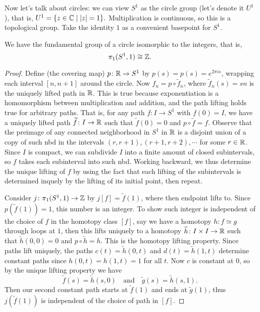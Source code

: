 Now let's talk about circles: we can view $S^{1} $ as the circle group (let's denote it $U^1$), that is, $U^1 = \{z\in \mathbb{C}\mid |z|=1\}.$ Multiplication is continuous, so this is a topological group. Take the identity $1$ as a convenient basepoint for  $S^{1} $.
\begin{theorem}
    We have the fundamental group of a circle isomorphic to the integers, that is, \[
        \pi_1(S^{1} ,1)\cong\mathbb{Z}.
    \] 
\end{theorem}
\begin{proof}
    Define (the covering map) $p \colon \mathbb{R} \to S^1 $ by $p(s)=p(s)=e^{2\pi is}$, wrapping each interval $[n,n+1]$ around the circle. Now $f_n =p\circ \widetilde f_n $, where $\widetilde f_n(s)=sn $ is the uniquely lifted path in $\mathbb{R}$. This is true because exponentiation is a homomorphism between multiplication and addition, and the path lifting holds true for arbitrary paths. That is, for any path $f \colon I \to S^1 $ with $f(0)=I$, we have a uniquely lifted path $\widetilde f\colon I \to \mathbb{R}$ such that $\widetilde f(0)=0$ and $p\circ \widetilde f=f$. Observe that the preimage of any connected neighborhood in $S^1 $ in $\mathbb{R}$ is a disjoint union of a copy of such nbd in the intervals $(r,r+1),(r+1,r+2),\cdots $ for some $r\in \mathbb{R}$. Since $I$ is compact, we can subdivide $I$ into a finite amount of closed subintervals, so $f$ takes each subinterval into such nbd. Working backward, we thus determine the unique lifting of $f$ by using the fact that each lifting of the subintervals is determined inquely by the lifting of its initial point, then repeat.

    Consider $j \colon \pi_1(S^1 ,1) \to \mathbb{Z}$ by $j[f]=\widetilde f(1)$, where then endpoint lifts to. Since $p( \widetilde f(1))=1$, this number is an integer. To show such integer is independent of the choice of $f$ in the homotopy class $[f]$, say we have a homotopy $h \colon f \simeq g$ through loops at $1$, then this lifts uniquely to a homotopy $\widetilde h \colon I\times I \to \mathbb{R}$ such that $\widetilde h(0,0)=0$ and $p\circ \widetilde h=h$. This is the homotopy lifting property. Since paths lift uniquely, the paths $c(t)=\widetilde h(0,t)$ and $d(t)=\widetilde h(1,t)$ determine constant paths since $h(0,t)=h(1,t)=1$ for all $t$. Now $c$ is constant at $0$, so by the unique lifting property we have \[
        \widetilde f(s)=\widetilde h(s,0) \quad \text{and} \quad \widetilde g(s)=\widetilde h(s,1).
    \] Then our second constant path starts at $\widetilde f(1)$ and ends at $\widetilde g(1)$, thus $j(\widetilde f(1))$ is independent of the choice of path in $[f]$.


\end{proof}

